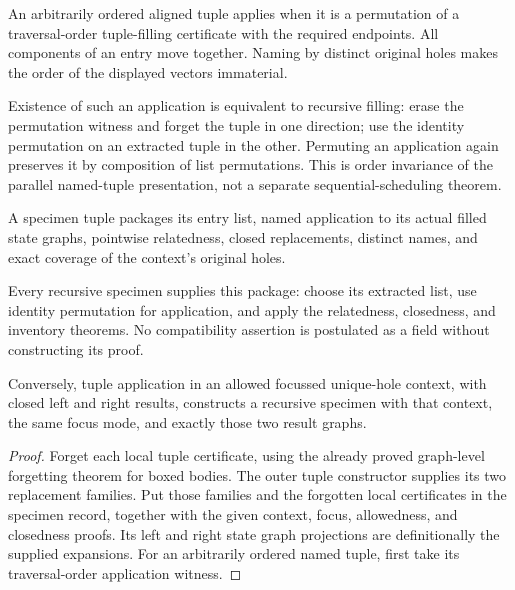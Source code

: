 \begin{definition}
An arbitrarily ordered aligned tuple applies when it is a permutation of a
traversal-order tuple-filling certificate with the required endpoints.
All components of an entry move together. Naming by distinct original holes
makes the order of the displayed vectors immaterial.
\end{definition}
Existence of such an application is equivalent to recursive filling: erase
the permutation witness and forget the tuple in one direction; use the
identity permutation on an extracted tuple in the other. Permuting an
application again preserves it by composition of list permutations. This is
order invariance of the parallel named-tuple presentation, not a separate
sequential-scheduling theorem.

\begin{definition}
A specimen tuple packages its entry list, named application to its actual
filled state graphs, pointwise relatedness, closed replacements, distinct
names, and exact coverage of the context's original holes.
\end{definition}
Every recursive specimen supplies this package: choose its extracted list,
use identity permutation for application, and apply the relatedness,
closedness, and inventory theorems. No compatibility assertion is postulated
as a field without constructing its proof.

\begin{theorem}
Conversely, tuple application in an allowed focussed unique-hole context,
with closed left and right results, constructs a recursive specimen with that
context, the same focus mode, and exactly those two result graphs.
\end{theorem}
\begin{proof}
Forget each local tuple certificate, using the already proved graph-level
forgetting theorem for boxed bodies. The outer tuple constructor supplies its
two replacement families. Put those families and the forgotten local
certificates in the specimen record, together with the given context, focus,
allowedness, and closedness proofs. Its left and right state graph projections
are definitionally the supplied expansions. For an arbitrarily ordered named
tuple, first take its traversal-order application witness.
\end{proof}

